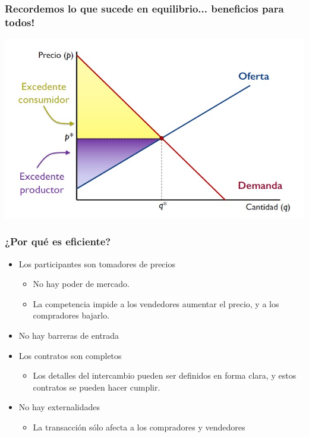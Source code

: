 \documentclass{beamer}
\begin{document}
\begin{frame}
\frametitle{Recordemos lo que sucede en equilibrio... beneficios para todos!}
\begin{center}
\includegraphics[scale=0.55]{../Figures/Tema_07.23_equilibrioyexcedente.jpg}
\end{center}
\end{frame}

\begin{frame}
\frametitle{¿Por qué es eficiente?}
\begin{itemize}
    \item Los participantes son tomadores de precios
    \begin{itemize}
        \item No hay poder de mercado.
        \item La competencia impide a los vendedores aumentar el precio, y a los compradores bajarlo.
    \end{itemize}
    \item No hay barreras de entrada
    \item Los contratos son completos
        \begin{itemize}
        \item Los detalles del intercambio pueden ser definidos en forma clara, y estos contratos se pueden hacer cumplir.
        \end{itemize}
    \item No hay externalidades
        \begin{itemize}
        \item La transacción sólo afecta a los compradores y vendedores
        \end{itemize}
\end{itemize}
\end{frame}
\end{document}
